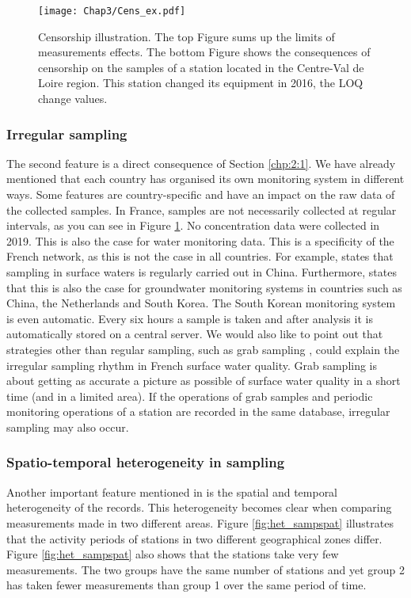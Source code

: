 \begin{figure}
    \centering
    \texttt{[image: Chap3/Cens\_ex.pdf]}
    \caption{Censorship illustration. The top Figure sums up the limits of measurements effects. The bottom Figure shows the consequences of censorship on the samples of a station located in the Centre-Val de Loire region. This station changed its equipment in 2016, the LOQ change values.}
    \label{fig:cens_ex}
\end{figure}

\subsubsection{Irregular sampling}

The second feature is a direct consequence of Section \ref{chp:2:1}. We have already mentioned that each country has organised its own monitoring system in different ways. Some features are country-specific and have an impact on the raw data of the collected samples. In France, samples are not necessarily collected at regular intervals, as you can see in Figure \ref{fig:cens_ex}. No concentration data were collected in 2019. This is also the case for water monitoring data. This is a specificity of the French network, as this is not the case in all countries. For example, \cite{Zhang2008} states that sampling in surface waters is regularly carried out in China. Furthermore, \cite{Joergensen2008} states that this is also the case for groundwater monitoring systems in countries such as China, the Netherlands and South Korea. The South Korean monitoring system is even automatic. Every six hours a sample is taken and after analysis it is automatically stored on a central server. We would also like to point out that strategies other than regular sampling, such as grab sampling \citep{Novic2017}, could explain the irregular sampling rhythm in French surface water quality. Grab sampling is about getting as accurate a picture as possible of surface water quality in a short time (and in a limited area). If the operations of grab samples and periodic monitoring operations of a station are recorded in the same database, irregular sampling may also occur.

\subsubsection{Spatio-temporal heterogeneity in sampling}

Another important feature mentioned in \cite{Baran2022} is the spatial and temporal heterogeneity of the records. This heterogeneity becomes clear when comparing measurements made in two different areas. Figure \ref{fig:het_sampspat} illustrates that the activity periods of stations in two different geographical zones differ. Figure \ref{fig:het_sampspat} also shows that the stations take very few measurements. The two groups have the same number of stations and yet group 2 has taken fewer measurements than group 1 over the same period of time.

